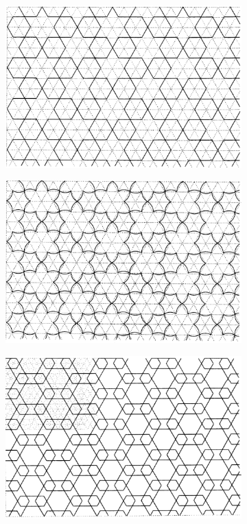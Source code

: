 \documentclass[12pt,letterpaper]{article}
\begin{document}
\begin{figure}[H]
    \begin{center}
        \caption{Examples of Islamic tessellations \citep{arabic}}
        \label{fig:islam}
        \begin{subfigure}[b]{.3\linewidth}
            \includegraphics[width=\linewidth]{islam1}
        \end{subfigure}
        \begin{subfigure}[b]{.3\linewidth}
            \includegraphics[width=\linewidth]{islam2}
        \end{subfigure}
        \begin{subfigure}[b]{.3\linewidth}
            \includegraphics[width=\linewidth]{islam3}

\end{subfigure}
\end{center}
\end{figure}
\end{document}
